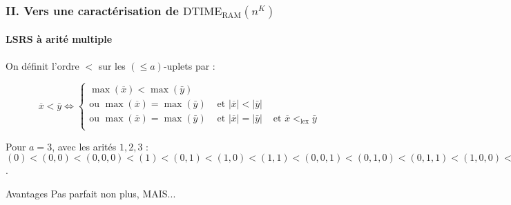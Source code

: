 \documentclass[10pt]{beamer}
\newcommand{\dtimeram}{\text{DTIME}_{\text{RAM}}\left( n^K \right)}
\newcommand{\leqa}{\left( \leqslant a \right)}
\begin{document}
	\begin{frame}
		\frametitle{II. Vers une caractérisation de $\dtimeram$}
		\framesubtitle{LSRS à arité multiple}
		
		\begin{defn}
			\label{def:bon_ordre_sur_uplets}
			On définit l'ordre $<$ sur les $\leqa$-uplets par :
			
			\[
			\overline{x} < \bar{y} \Leftrightarrow \left\lbrace
			\begin{array}{ccc}
			\max\left(\overline{x}\right) < \max\left(\bar{y}\right) & & \\
			\text{ou } \max\left(\overline{x}\right) = \max\left(\bar{y}\right) & 
			\text{ et } \left|\overline{x}\right| < \left|\bar{y}\right| & \\
			\text{ou } \max\left(\overline{x}\right) = \max\left(\bar{y}\right) & 
			\text{ et } \left|\overline{x}\right| = \left|\bar{y}\right| & 
			\text{ et } \overline{x} <_{\text{lex}} \bar{y}\\
			\end{array}
			\right. 
			\]
			
		\end{defn}
		
		\pause
		
		\begin{exemple}
			Pour $a = 3$, avec les arités $1,2,3$ : $(0) < (0, 0) < (0,0,0) < (1) < (0,1) < (1,0) < (1,1) < (0,0,1) < (0,1,0) < (0,1,1) < (1,0,0) < (1,0,1) < (1,1,0) < (1,1,1) < (2) < (0,2) < \dots$.
		\end{exemple}
		
		\pause 
		
		\begin{block}{Avantages}
			Pas parfait non plus, MAIS...
		\end{block}
	\end{frame}
	
\end{document}
